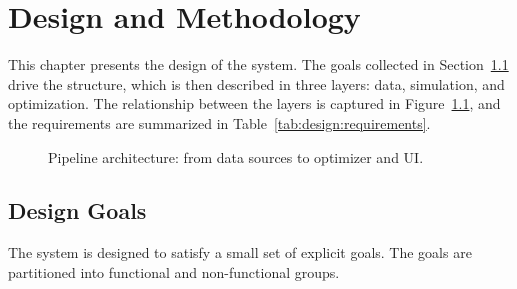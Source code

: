 \chapter{Design and Methodology}
\label{ch:design}

This chapter presents the design of the system. The goals collected in Section~\ref{ch:design:goals} drive the structure, which is then described in three layers: data, simulation, and optimization. The relationship between the layers is captured in Figure~\ref{fig:design:architecture}, and the requirements are summarized in Table~\ref{tab:design:requirements}.

\begin{figure}[hbt!]
	\centering
	\caption{Pipeline architecture: from data sources to optimizer and UI.}
	\label{fig:design:architecture}
\end{figure}

\section{Design Goals}
\label{ch:design:goals}

The system is designed to satisfy a small set of explicit goals. The goals are partitioned into functional and non-functional groups.

